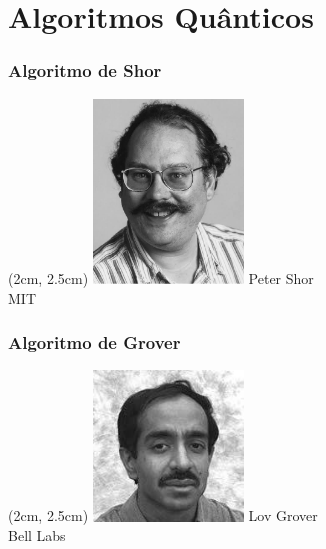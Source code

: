 \documentclass[14pt]{beamer}
\begin{document}
	\frame%
	{
				
	}
	
	\section{Algoritmos Quânticos}
	\frame%
	{
		\frametitle{Algoritmo de Shor}
		
		\begin{textblock*}{4cm}(2cm, 2.5cm) %
			\includegraphics[width=4cm]{shor.jpg}
			Peter Shor\\
			{\centering\small MIT}
		\end{textblock*}		
	}

	\frame%
	{
		\frametitle{Algoritmo de Grover}
		
		\begin{textblock*}{4cm}(2cm, 2.5cm) %
			\includegraphics[width=4cm]{grover.jpg}
			Lov Grover\\
			{\centering\small Bell Labs}
		\end{textblock*}		
	}
	
	\frame%
	{
				
	}
	
	\frame%
	{
				
	}

	\frame%
	{
				
	}
	
	\frame%
	{
				
	}
	
	\frame%
	{
				
	}
	
	\frame%
	{
				
	}
\end{document}
